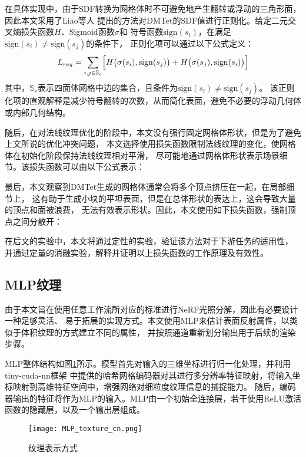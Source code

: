 在具体实现中，由于SDF转换为网格体时不可避免地产生翻转或浮动的三角形面，因此本文采用了Liao等人\cite{Liao_2018}
提出的方法对DMTet的SDF值进行正则化。给定二元交叉熵损失函数$H$、Sigmoid函数$\sigma$和
符号函数$\mathrm{sign}(s_i)$，在满足$\mathrm{sign}(s_i)\neq\mathrm{sign}(s_j)$的条件下，
正则化项可以通过以下公式定义：
\begin{equation}\label{eq:Lreg}
L_{reg}=\sum_{i,j\in\mathbb{S}_e}\Bigl[H\bigl(\sigma(s_i),\mathrm{sign}(s_j)\bigr)+H\bigl(\sigma(s_j),\mathrm{sign}(s_i)\bigr)\Bigr]
\end{equation}
其中，$\mathbb{S}_e$表示四面体网格中边的集合，且条件为$\mathrm{sign}(s_i)\neq\mathrm{sign}(s_j)$。
该正则化项的直观解释是减少符号翻转的次数，从而简化表面，避免不必要的浮动几何体或内部几何结构。

随后，在对法线纹理优化的阶段中，本文没有强行固定网格体形状，但是为了避免上文所说的优化冲突问题，
本文选择使用损失函数限制法线纹理的变化，使网格体在初始化阶段保持法线纹理相对平滑，
尽可能地通过网格体形状表示场景细节。该损失函数可以由以下公式表示：

最后，本文观察到DMTet生成的网格体通常会将多个顶点挤压在一起，在局部细节上，
这有助于生成小块的平坦表面，但是在总体形状的表达上，这会导致大量的顶点和面被浪费，
无法有效表示形状。因此，本文使用如下损失函数，强制顶点之间分散开：

在后文的实验中，本文将通过定性的实验，验证该方法对于下游任务的适用性，
并通过定量的消融实验，解释并证明以上损失函数的工作原理及有效性。

\subsection{MLP纹理}
由于本文旨在使用任意工作流所对应的标准进行NeRF光照分解，因此有必要设计一种足够灵活、
易于拓展的实现方式。本文使用MLP来估计表面反射属性，以类似于体积纹理的方式建立不同的属性，
并按照通道重新划分输出用于后续的渲染步骤。

MLP整体结构如图\ref{fig:mlp_texture_cn}所示。模型首先对输入的三维坐标进行归一化处理，并利用tiny-cuda-nn框架\cite{Muller_tiny-cuda-nn_2021}
中提供的哈希网格编码器对其进行多分辨率特征映射，将输入坐标映射到高维特征空间中，增强网络对细粒度纹理信息的捕捉能力。
随后，编码器输出的特征将作为MLP的输入。MLP由一个初始全连接层，若干使用ReLU激活函数的隐藏层，以及一个输出层组成。
\begin{figure}[htb]
  \centering
  \texttt{[image: MLP\_texture\_cn.png]}
  \caption{纹理表示方式}
  \label{fig:mlp_texture_cn}
\end{figure}

